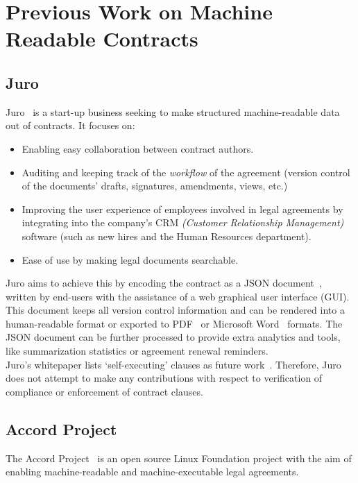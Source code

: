 \section{Previous Work on Machine Readable Contracts}\label{sec:machine-readable-contracts}

\subsection{Juro}\label{subsec:juro}
Juro~\cite{juroWhitepaper} is a start-up business seeking to make structured machine-readable data out of contracts.
It focuses on:
\begin{itemize}
    \item Enabling easy collaboration between contract authors.
    \item Auditing and keeping track of the \textit{workflow} of the agreement (version control of the documents'
    drafts, signatures, amendments, views, etc.)
    \item Improving the user experience of employees involved in legal agreements by integrating into the company's CRM
    \textit{(Customer Relationship Management)} software (such as new hires and the Human Resources department).
    \item Ease of use by making legal documents searchable.
\end{itemize}

Juro aims to achieve this by encoding the contract as a JSON document~\cite{jsonSpec}, written by end-users
with the assistance of a web graphical user interface (GUI).
This document keeps all version control information and can be rendered into a human-readable format or exported
to PDF~\cite{pdf2020spec} or Microsoft Word~\cite{microsoftWordWeb} formats.
The JSON document can be further processed to provide extra analytics and tools, like summarization statistics or
agreement renewal reminders.\\

Juro's whitepaper lists `self-executing' clauses as future work~\cite[p.~6]{juroWhitepaper}.
Therefore, Juro does not attempt to make any contributions with respect to verification of compliance or enforcement of
contract clauses.

\subsection{Accord Project}\label{subsec:accord}

The Accord Project~\cite{accordHomepage} is an open source Linux Foundation project with the aim of enabling
machine-readable and machine-executable legal agreements.

